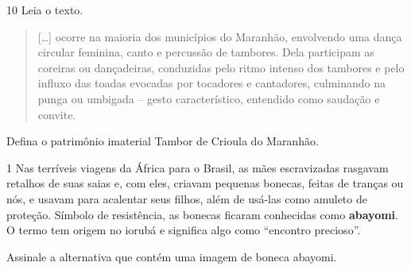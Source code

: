 \num{10} Leia o texto.
%


\begin{quote}
{[}\ldots{}{]} ocorre na maioria dos municípios do
Maranhão, envolvendo uma dança circular feminina, canto e percussão de
tambores. Dela participam as coreiras ou dançadeiras, conduzidas pelo
ritmo intenso dos tambores e pelo influxo das toadas evocadas por
tocadores e cantadores, culminando na punga ou umbigada -- gesto
característico, entendido como saudação e convite.

\end{quote}

Defina o patrimônio imaterial Tambor de Crioula do Maranhão.




\num{1}  Nas terríveis viagens da África para o Brasil, as mães escravizadas
rasgavam retalhos de suas saias e, com eles, criavam pequenas bonecas, feitas
de tranças ou nós, e usavam para acalentar seus filhos, além de usá-las como
amuleto de proteção. Símbolo de resistência, as bonecas ficaram conhecidas
como \textbf{abayomi}. O termo tem origem no iorubá e significa algo como
“encontro precioso”.

Assinale a alternativa que contém uma imagem de boneca abayomi.
%
%
%
%
%
%

